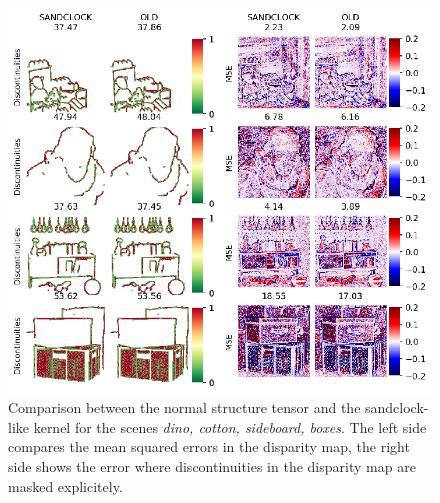 \documentclass  [
  paper    = a4,
  BCOR     = 10mm,
  twoside,
  fontsize = 12pt,
  fleqn,
  toc      = bibnumbered,
  toc      = listofnumbered,
  numbers  = noendperiod,
  headings = normal,
  listof   = leveldown,
  version  = 3.03
]                                       {scrreprt}
\begin{document}
\begin{figure}
	\centering
	\includegraphics[width=1\linewidth]{images/sandclock_results}
	\caption[Results with custom sized kernel]{Comparison between the normal structure tensor and the sandclock- like kernel for the scenes \textit{dino, cotton, sideboard, boxes}. The left side compares the mean squared errors in the disparity map, the right side shows the error where discontinuities in the disparity map are masked explicitely.}
	\label{fig:sandclockresults}
\end{figure}
\end{document}
